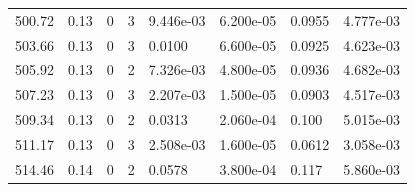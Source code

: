\documentclass[preview]{standalone}
\begin{document}
{{{{{{{{\begin{tabular}{L{1.2cm}C{1.2cm} C{0.3cm}C{0.5cm} C{1.4cm}C{1.4cm} C{1.4cm}C{1.4cm}}
  500.72  &  0.13  & 0     &  3 &  9.446e-03  & 6.200e-05  & 0.0955 &  4.777e-03   \\ 
  503.66  &  0.13  & 0     &  3 &  0.0100  & 6.600e-05  & 0.0925 &  4.623e-03   \\ 
  505.92  &  0.13  & 0     &  2 &  7.326e-03  & 4.800e-05  & 0.0936 &  4.682e-03   \\ 
  507.23  &  0.13  & 0     &  3 &  2.207e-03  & 1.500e-05  & 0.0903 &  4.517e-03   \\ 
  509.34  &  0.13  & 0     &  2 &  0.0313  & 2.060e-04  & 0.100 &  5.015e-03   \\ 
  511.17  &  0.13  & 0     &  3 &  2.508e-03  & 1.600e-05  & 0.0612 &  3.058e-03   \\ 
  514.46  &  0.14  & 0     &  2 &  0.0578  & 3.800e-04  & 0.117 &  5.860e-03   \\ 
\hline 
\end{tabular} 

}}}}}}}}
\end{document}
